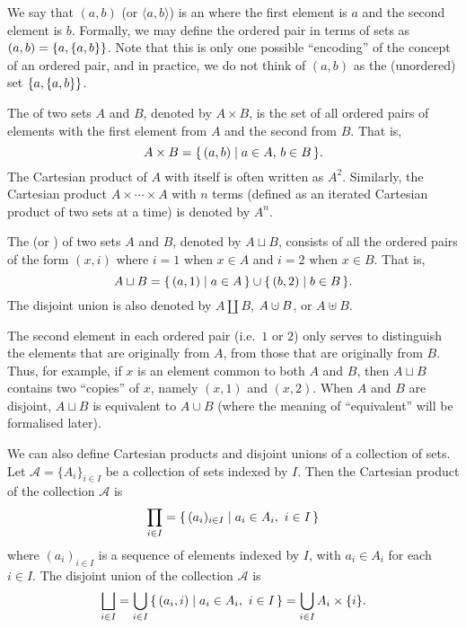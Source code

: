 We say that $(a, b)$ (or $\langle a, b \rangle$) is an  where the first element is $a$ and the second element is $b$. Formally, we may define the ordered pair in terms of sets as $(a, b) = \qty{a, \qty{a, b}}$. Note that this is only one possible ``encoding'' of the concept of an ordered pair, and in practice, we do not think of $(a, b)$ as the (unordered) set $\qty{a, \qty{a, b}}$.

The  of two sets $A$ and $B$, denoted by $A \times B$, is the set of all ordered pairs of elements with the first element from $A$ and the second from $B$. That is,
\begin{equation*}
A \times B = \qty{\, (a, b) \mid a \in A,\, b \in B \,}.
\end{equation*}
The Cartesian product of $A$ with itself is often written as $A^2$. Similarly, the Cartesian product $A \times \cdots \times A$ with $n$ terms (defined as an iterated Cartesian product of two sets at a time) is denoted by $A^n$. 

The  (or ) of two sets $A$ and $B$, denoted by $A \sqcup B$, consists of all the ordered pairs of the form $(x, i)$ where $i = 1$ when $x \in A$ and $i = 2$ when $x \in B$. That is,
\begin{equation*}
A \sqcup B = \qty{\, (a, 1) \mid a \in A \,} \cup \qty{\, (b, 2) \mid b \in B \,}.
\end{equation*}
The disjoint union is also denoted by $A \coprod B$, $A \mathbin{\mathaccent\cdot\cup} B$, or $A \uplus B$.

\begin{Note*}
The second element in each ordered pair (i.e.\ $1$ or $2$) only serves to distinguish the elements that are originally from $A$, from those that are originally from $B$. Thus, for example, if $x$ is an element common to both $A$ and $B$, then $A \sqcup B$ contains two ``copies'' of $x$, namely $(x, 1)$ and $(x, 2)$. When $A$ and $B$ are disjoint, $A \sqcup B$ is equivalent to $A \cup B$ (where the meaning of ``equivalent'' will be formalised later).
\end{Note*}

We can also define Cartesian products and disjoint unions of a collection of sets. Let $\mathcal A = \{A_i\}_{i \in I}$ be a collection of sets indexed by $I$. Then the Cartesian product of the collection $\mathcal A$ is
\begin{equation*}
\prod_{i \in I} = \qty{\, (a_i)_{i \in I} \mid a_i \in A_i,~ i \in I \,}
\end{equation*}
where $(a_i)_{i \in I}$ is a sequence of elements indexed by $I$, with $a_i \in A_i$ for each $i \in I$. The disjoint union of the collection $\mathcal A$ is
\begin{equation*}
\bigsqcup_{i \in I} = \bigcup_{i \in I} \qty{\, (a_i, i) \mid a_i \in A_i,~ i \in I \,} = \bigcup_{i \in I} A_i \times \{i\}.
\end{equation*}

